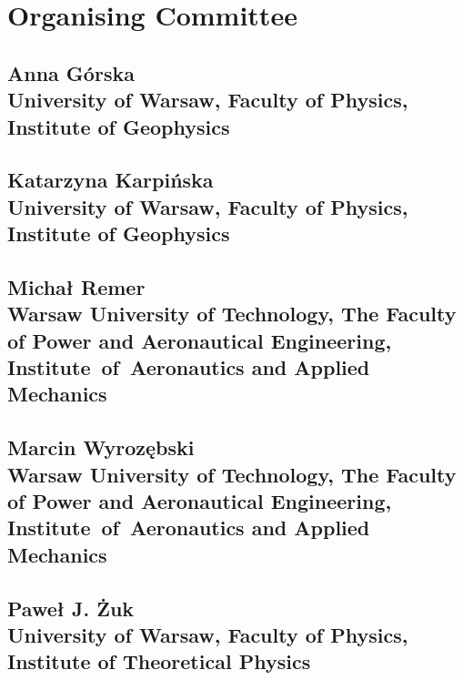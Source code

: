 \section*{Organising Committee}

\vspace{.5cm}

\subsection*{Anna Górska \\
\normalfont University of Warsaw, Faculty of Physics, Institute of Geophysics }

\subsection*{Katarzyna Karpińska \\ 
\normalfont University of Warsaw, Faculty of Physics, Institute of Geophysics }

\subsection*{Michał Remer \\
\normalfont Warsaw University of Technology, The Faculty of Power and Aeronautical Engineering, Institute~of~Aeronautics and Applied Mechanics }

\subsection*{Marcin Wyrozębski \\
\normalfont Warsaw University of Technology, The Faculty of Power and Aeronautical Engineering, Institute~of~Aeronautics and Applied Mechanics}

\subsection*{Paweł J. Żuk \\
\normalfont University of Warsaw, Faculty of Physics, Institute of Theoretical Physics }

